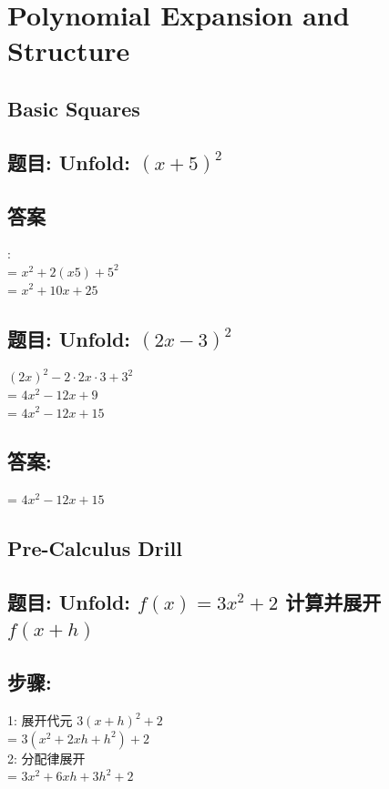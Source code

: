 \documentclass[12pt]{article}
\begin{document}
\section{Polynomial Expansion and Structure}


\subsection*{Basic Squares}
\subsection*{题目: Unfold:  $(x+5)^{2}$}

\subsection*{答案}: \\
= $x^{2} + 2(x5) + 5^{2}$ \\
= $x^{2} + 10x + 25$

\subsection*{题目: Unfold:  $(2x-3)^{2}$}
$(2x)^{2} - 2\cdot2x\cdot3 + 3^{2}$ \\
= $4x^{2} - 12x + 9$ \\
= $4x^{2} - 12x + 15$  \\

\subsection*{答案:} 
= $4x^{2} - 12x + 15$ 

\subsection*{Pre-Calculus Drill}
\subsection*{题目: Unfold:  $f(x) = 3x^{2} + 2$  计算并展开 $f(x+h)$}
\subsection*{步骤:}
1: 展开代元
$3(x+h)^{2} + 2$ \\
= $3(x^{2} + 2xh + h^{2}) + 2$ \\
2: 分配律展开 \\
= $3x^{2} + 6xh + 3h^{2} + 2$ \\
\end{document}
